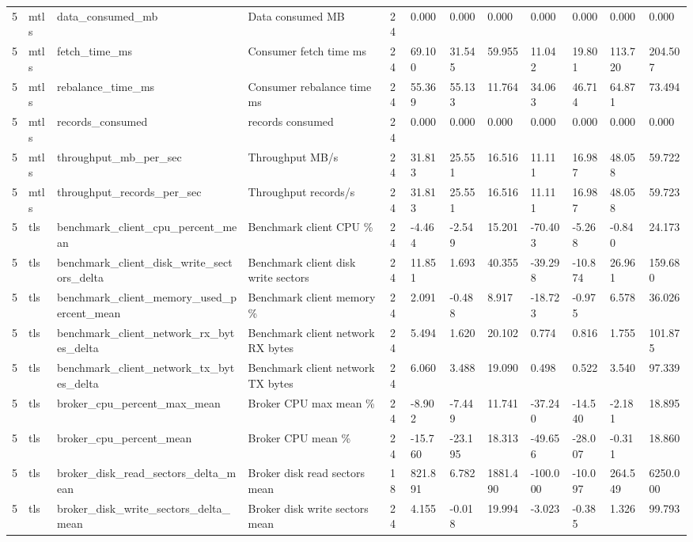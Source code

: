 \begin{tabular}{llllllllllll}
5 & mtls & data\_consumed\_mb & Data consumed MB & 24 & 0.000 & 0.000 & 0.000 & 0.000 & 0.000 & 0.000 & 0.000 \\
5 & mtls & fetch\_time\_ms & Consumer fetch time ms & 24 & 69.100 & 31.545 & 59.955 & 11.042 & 19.801 & 113.720 & 204.507 \\
5 & mtls & rebalance\_time\_ms & Consumer rebalance time ms & 24 & 55.369 & 55.133 & 11.764 & 34.063 & 46.714 & 64.871 & 73.494 \\
5 & mtls & records\_consumed & records consumed & 24 & 0.000 & 0.000 & 0.000 & 0.000 & 0.000 & 0.000 & 0.000 \\
5 & mtls & throughput\_mb\_per\_sec & Throughput MB/s & 24 & 31.813 & 25.551 & 16.516 & 11.111 & 16.987 & 48.058 & 59.722 \\
5 & mtls & throughput\_records\_per\_sec & Throughput records/s & 24 & 31.813 & 25.551 & 16.516 & 11.111 & 16.987 & 48.058 & 59.723 \\
5 & tls & benchmark\_client\_cpu\_percent\_mean & Benchmark client CPU \% & 24 & -4.464 & -2.549 & 15.201 & -70.403 & -5.268 & -0.840 & 24.173 \\
5 & tls & benchmark\_client\_disk\_write\_sectors\_delta & Benchmark client disk write sectors & 24 & 11.851 & 1.693 & 40.355 & -39.298 & -10.874 & 26.961 & 159.680 \\
5 & tls & benchmark\_client\_memory\_used\_percent\_mean & Benchmark client memory \% & 24 & 2.091 & -0.488 & 8.917 & -18.723 & -0.975 & 6.578 & 36.026 \\
5 & tls & benchmark\_client\_network\_rx\_bytes\_delta & Benchmark client network RX bytes & 24 & 5.494 & 1.620 & 20.102 & 0.774 & 0.816 & 1.755 & 101.875 \\
5 & tls & benchmark\_client\_network\_tx\_bytes\_delta & Benchmark client network TX bytes & 24 & 6.060 & 3.488 & 19.090 & 0.498 & 0.522 & 3.540 & 97.339 \\
5 & tls & broker\_cpu\_percent\_max\_mean & Broker CPU max mean \% & 24 & -8.902 & -7.449 & 11.741 & -37.240 & -14.540 & -2.181 & 18.895 \\
5 & tls & broker\_cpu\_percent\_mean & Broker CPU mean \% & 24 & -15.760 & -23.195 & 18.313 & -49.656 & -28.007 & -0.311 & 18.860 \\
5 & tls & broker\_disk\_read\_sectors\_delta\_mean & Broker disk read sectors mean & 18 & 821.891 & 6.782 & 1881.490 & -100.000 & -10.097 & 264.549 & 6250.000 \\
5 & tls & broker\_disk\_write\_sectors\_delta\_mean & Broker disk write sectors mean & 24 & 4.155 & -0.018 & 19.994 & -3.023 & -0.385 & 1.326 & 99.793 \\

\end{tabular}
